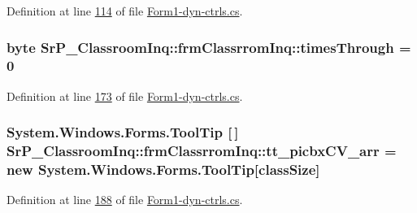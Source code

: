 \-Definition at line \hyperlink{_form1-dyn-ctrls_8cs_source_l00114}{114} of file \hyperlink{_form1-dyn-ctrls_8cs_source}{\-Form1-\/dyn-\/ctrls.\-cs}.

\hypertarget{class_sr_p___classroom_inq_1_1frm_classrrom_inq_ab730336bf81938256d6f20922c15484b}{
\subsubsection[{times\-Through}]{\setlength{\rightskip}{0pt plus 5cm}byte {\bf \-Sr\-P\-\_\-\-Classroom\-Inq\-::frm\-Classrrom\-Inq\-::times\-Through} = 0}}
\label{class_sr_p___classroom_inq_1_1frm_classrrom_inq_ab730336bf81938256d6f20922c15484b}


\-Definition at line \hyperlink{_form1-dyn-ctrls_8cs_source_l00173}{173} of file \hyperlink{_form1-dyn-ctrls_8cs_source}{\-Form1-\/dyn-\/ctrls.\-cs}.

\hypertarget{class_sr_p___classroom_inq_1_1frm_classrrom_inq_a2b443a71216ac1b9a63f9db496161a4d}{
\subsubsection[{tt\-\_\-picbx\-C\-V\-\_\-arr}]{\setlength{\rightskip}{0pt plus 5cm}\-System.\-Windows.\-Forms.\-Tool\-Tip \mbox{[}$\,$\mbox{]} {\bf \-Sr\-P\-\_\-\-Classroom\-Inq\-::frm\-Classrrom\-Inq\-::tt\-\_\-picbx\-C\-V\-\_\-arr} = new \-System.\-Windows.\-Forms.\-Tool\-Tip\mbox{[}{\bf class\-Size}\mbox{]}}}
\label{class_sr_p___classroom_inq_1_1frm_classrrom_inq_a2b443a71216ac1b9a63f9db496161a4d}


\-Definition at line \hyperlink{_form1-dyn-ctrls_8cs_source_l00188}{188} of file \hyperlink{_form1-dyn-ctrls_8cs_source}{\-Form1-\/dyn-\/ctrls.\-cs}.

